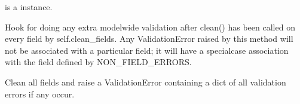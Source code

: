\documentclass[letterpaper,10pt,english]{sphinxmanual}
\begin{document}
\begin{fulllineitems}
\begin{fulllineitems}
\sphinxAtStartPar
{} is a  instance.

\end{fulllineitems}


\begin{fulllineitems}
\label{\detokenize{tasks:tasks.models.Task.assigned_to_id}}
\pysigstartsignatures
{}
\pysigstopsignatures
\end{fulllineitems}


\begin{fulllineitems}
\label{\detokenize{tasks:tasks.models.Task.check}}
\pysigstartsignatures
{}
\pysigstopsignatures
\end{fulllineitems}


\begin{fulllineitems}
\label{\detokenize{tasks:tasks.models.Task.clean}}
\pysigstartsignatures
{}
\pysigstopsignatures
\sphinxAtStartPar
Hook for doing any extra model\sphinxhyphen{}wide validation after clean() has been
called on every field by self.clean\_fields. Any ValidationError raised
by this method will not be associated with a particular field; it will
have a special\sphinxhyphen{}case association with the field defined by NON\_FIELD\_ERRORS.

\end{fulllineitems}


\begin{fulllineitems}
\label{\detokenize{tasks:tasks.models.Task.clean_fields}}
\pysigstartsignatures
{}
\pysigstopsignatures
\sphinxAtStartPar
Clean all fields and raise a ValidationError containing a dict
of all validation errors if any occur.


\end{fulllineitems}
\end{fulllineitems}
\end{document}
